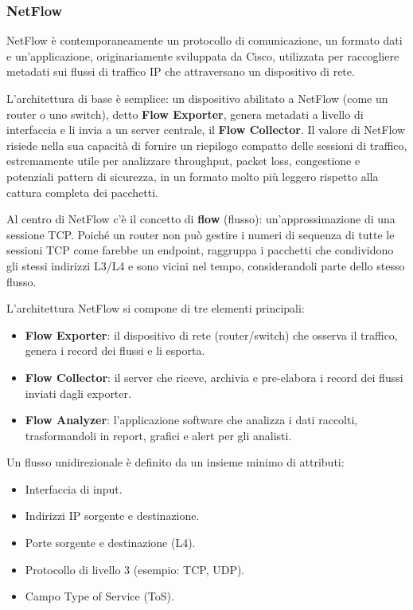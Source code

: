 \subsubsection{NetFlow}

NetFlow è contemporaneamente un protocollo di comunicazione, un formato dati
e un'applicazione, originariamente sviluppata da Cisco, utilizzata per raccogliere
metadati sui flussi di traffico IP che attraversano un dispositivo di rete.

L'architettura di base è semplice: un dispositivo abilitato a NetFlow
(come un router o uno switch), detto \textbf{Flow Exporter}, genera metadati
a livello di interfaccia e li invia a un server centrale, il \textbf{Flow Collector}.
Il valore di NetFlow risiede nella sua capacità di fornire un riepilogo compatto
delle sessioni di traffico, estremamente utile per analizzare throughput,
packet loss, congestione e potenziali pattern di sicurezza, in un formato
molto più leggero rispetto alla cattura completa dei pacchetti.

Al centro di NetFlow c'è il concetto di \textbf{flow} (flusso): un'approssimazione
di una sessione TCP. Poiché un router non può gestire i numeri di sequenza di
tutte le sessioni TCP come farebbe un endpoint, raggruppa i pacchetti che
condividono gli stessi indirizzi L3/L4 e sono vicini nel tempo, considerandoli
parte dello stesso flusso.

L'architettura NetFlow si compone di tre elementi principali:

\begin{itemize}
\item \textbf{Flow Exporter}: il dispositivo di rete (router/switch) che osserva
il traffico, genera i record dei flussi e li esporta.
\item \textbf{Flow Collector}: il server che riceve, archivia e pre-elabora
i record dei flussi inviati dagli exporter.
\item \textbf{Flow Analyzer}: l'applicazione software che analizza i dati
raccolti, trasformandoli in report, grafici e alert per gli analisti.
\end{itemize}

Un flusso unidirezionale è definito da un insieme minimo di attributi:
\begin{itemize}
\item Interfaccia di input.
\item Indirizzi IP sorgente e destinazione.
\item Porte sorgente e destinazione (L4).
\item Protocollo di livello 3 (esempio: TCP, UDP).
\item Campo Type of Service (ToS).
\end{itemize}

